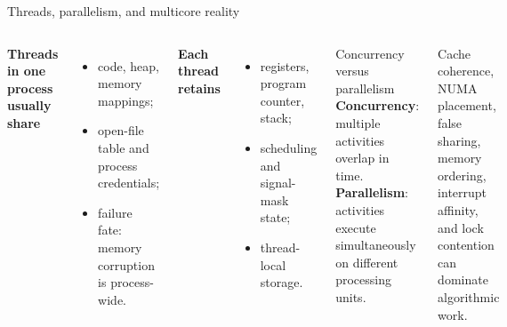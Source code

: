 \documentclass[aspectratio=169,11pt]{beamer}
\newcommand{\concept}[1]{\textcolor{osblue}{\textbf{#1}}}
\begin{document}
\begin{frame}{Threads, parallelism, and multicore reality}
  \begin{columns}[T,onlytextwidth]
      \textbf{Threads in one process usually share}
      \begin{itemize}
        \item code, heap, memory mappings;
        \item open-file table and process credentials;
        \item failure fate: memory corruption is process-wide.
      \end{itemize}
      \textbf{Each thread retains}
      \begin{itemize}
        \item registers, program counter, stack;
        \item scheduling and signal-mask state;
        \item thread-local storage.
      \end{itemize}
      \begin{block}{Concurrency versus parallelism}
        \concept{Concurrency}: multiple activities overlap in time.\\
        \concept{Parallelism}: activities execute simultaneously on different processing units.
      \end{block}
      \begin{tcolorbox}[title=Multicore complications,colback=osorange!5,colframe=osorange!65]
        Cache coherence, NUMA placement, false sharing, memory ordering, interrupt affinity, and lock contention can dominate algorithmic work.
      \end{tcolorbox}
  \end{columns}
\end{frame}
\end{document}
